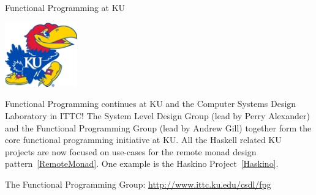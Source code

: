 \begin{hcarentry}{Functional Programming at KU}
\label{ukansas}
\makeheader

\begin{center}
\includegraphics[width=0.235\textwidth]{html/jh2.jpg}
\end{center}

Functional Programming continues at KU and the Computer Systems Design
Laboratory in ITTC!  The System Level Design Group (lead by Perry Alexander)
and the Functional Programming Group (lead by Andrew Gill) together form the
core functional programming initiative at KU. All the Haskell related
KU projects are now
focused on use-cases for the remote monad design pattern~\cref{RemoteMonad}.
One example is the Haskino Project~\cref{Haskino}.

\FurtherReading
The Functional Programming Group:
    \url{http://www.ittc.ku.edu/csdl/fpg}
\end{hcarentry}
